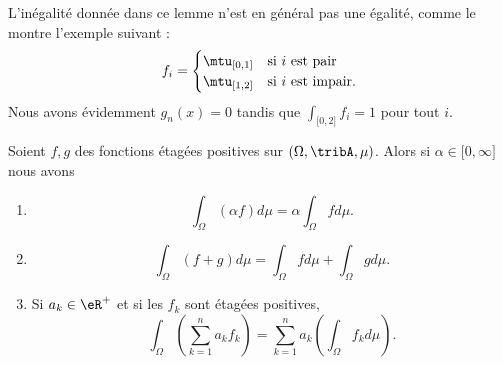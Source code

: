L'inégalité donnée dans ce lemme n'est en général pas une égalité, comme le montre l'exemple suivant :
\begin{equation}
    f_i=\begin{cases}
        \mtu_{\mathopen[ 0 , 1 \mathclose]}    &   \text{si } i\text{ est pair}\\
        \mtu_{\mathopen[ 1 , 2 \mathclose]}    &    \text{si } i\text{ est impair}.
    \end{cases}
\end{equation}
Nous avons évidemment \( g_n(x)=0\) tandis que \( \int_{\mathopen[ 0 , 2 \mathclose]}f_i=1\) pour tout \( i\).

\begin{theorem}        \label{ThoooCZCXooVvNcFD}
    Soient \( f,g\) des fonctions étagées positives sur \( (\Omega,\tribA,\mu)\). Alors si \( \alpha\in\mathopen[ 0 , \infty \mathclose]\) nous avons
    \begin{enumerate}
        \item
            \begin{equation}
                \int_{\Omega}(\alpha f)d\mu=\alpha\int_{\Omega}fd\mu.
            \end{equation}
        \item       \label{ITEMooBLEVooDznQTY}
            \begin{equation}
                \int_{\Omega}(f+g)d\mu=\int_{\Omega}fd\mu+\int_{\Omega}gd\mu.
            \end{equation}
        \item\label{ITEMooOJRAooQkoQyD}
    Si \( a_k\in \eR^+\) et si les \( f_k\) sont étagées positives,
    \begin{equation}
        \int_{\Omega}\left( \sum_{k=1}^na_kf_k \right)=\sum_{k=1}^na_k\left( \int_{\Omega} f_kd\mu \right).
    \end{equation}
    \end{enumerate}
\end{theorem}

